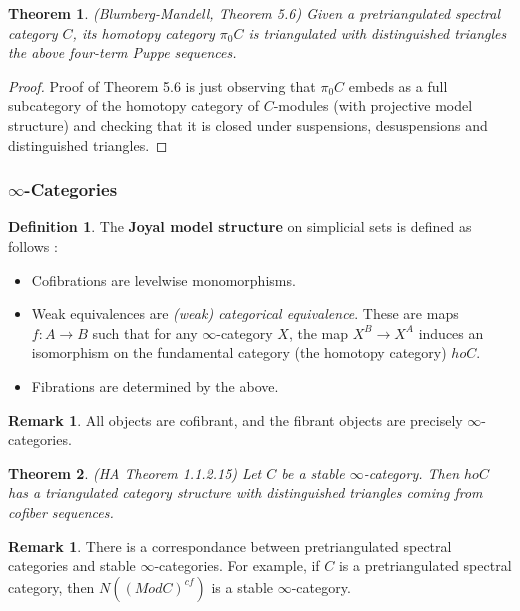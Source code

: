 \documentclass[letterpaper]{article}
\newtheorem{theorem}{Theorem}
\theoremstyle{definition}
\newtheorem{definition}[lemma]{Definition}
\newtheorem{remark}[lemma]{Remark}
\begin{document}
\begin{theorem}(Blumberg-Mandell, Theorem 5.6)
Given a pretriangulated spectral category $C$, its homotopy category $\pi_0 C$ is triangulated with distinguished triangles the above four-term Puppe sequences.
\end{theorem}

\begin{proof}
Proof of Theorem 5.6 is just observing that $\pi_0 C$ embeds as a full subcategory of the homotopy category of $C$-modules (with projective model structure) and checking that it is closed under suspensions, desuspensions and distinguished triangles.
\end{proof}

\subsubsection{$\infty$-Categories}

\begin{definition} The \textbf{Joyal model structure} on simplicial sets is defined as follows :
\begin{itemize}
\item Cofibrations are levelwise monomorphisms.
\item Weak equivalences are \textit{(weak) categorical equivalence}. These are maps $f : A \rightarrow B$ such that for any $\infty$-category $X$, the map $X^B \rightarrow X^A$ induces an isomorphism on the fundamental category (the homotopy category) $ho C$.
\item Fibrations are determined by the above.
\end{itemize}
\end{definition}

\begin{remark}
All objects are cofibrant, and the fibrant objects are precisely $\infty$-categories.
\end{remark}

\begin{theorem}(HA Theorem 1.1.2.15) Let $C$ be a stable $\infty$-category. Then $ho C$ has a triangulated category structure with distinguished triangles coming from cofiber sequences.
\end{theorem}

\begin{remark}
There is a correspondance between pretriangulated spectral categories and stable $\infty$-categories. For example, if $C$ is a pretriangulated spectral category, then $N((ModC)^{cf})$ is a stable $\infty$-category.
\end{remark}
\end{document}
